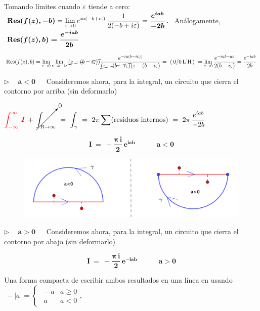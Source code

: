 Tomando límites cuando $\varepsilon$ tiende a cero: $\displaystyle \ \boldsymbol{ \Res(f(z),-b)}= \lim_{\varepsilon \to 0}  e^{ia(-b+i\varepsilon)}\, \dfrac{1}{2(-b+i\varepsilon)} = \boldsymbol{ \dfrac{e^{iab}}{-2b}}\, . \ $ Análogamente, $\ \boldsymbol{ \Res(f(z),b)=  \dfrac{e^{-iab}}{2b}} $


\begin{small} \textcolor{gris}{
	$\displaystyle \Res(f(z),b)=\lim_{\varepsilon\to 0} \lim_{z\to b-i\varepsilon} \cancel{(z-(b-i\varepsilon))} \dfrac{e^{-ia(b-i\varepsilon))}} {\cancel{(z-(b-i\varepsilon)}(z-(b+i\varepsilon)}=\  (\, 0/0\, \text{L'H}\, ) \ = \lim_{\varepsilon\to 0} \dfrac { e^{-iab-a\varepsilon} }{2(b-i\varepsilon)}= \dfrac{e^{-iab}}{2b}$  } \end{small}

$\triangleright \quad \boldsymbol{ \boxed{\ a<0\ }} \quad $ Consideremos ahora, para la integral, un circuito que cierra el contorno por arriba (sin deformarlo)

$\displaystyle \textcolor{red}{\int_{-\infty}^{\infty} \, \boldsymbol I} \, + \, \cancelto{0}{\int_{R\to \infty}}\ = \ \int_\gamma \ = \ 2\pi \sum (\text{residuos internos}) \ = \ 2\pi \, \dfrac{e^{iab}}{-2b}$

$$\boldsymbol{ I \ = \ - \dfrac{\pi\, i}{2} \, e^{iab} } \qquad \quad \boldsymbol{a<0}$$

\begin{figure}[H]
	\centering
	\includegraphics[width=.95\textwidth]{imagenes/img43-06.png}
 \end{figure}
 
 $\triangleright \quad \boldsymbol{ \boxed{\ a>0\ }} \quad $ Consideremos ahora, para la integral, un circuito que cierra el contorno por abajo (sin deformarlo)
 
 $$\boldsymbol{ I \ = \ - \dfrac{\pi\, i}{2} \, e^{-iab} } \qquad \quad \boldsymbol{a>0}$$
 
 Una forma compacta de escribir ambos resultados en una línea en usando $\ -|a| = \begin{cases} \ -a & a\ge 0 \\ \ \ a  & a< 0 \end{cases}$,
 

